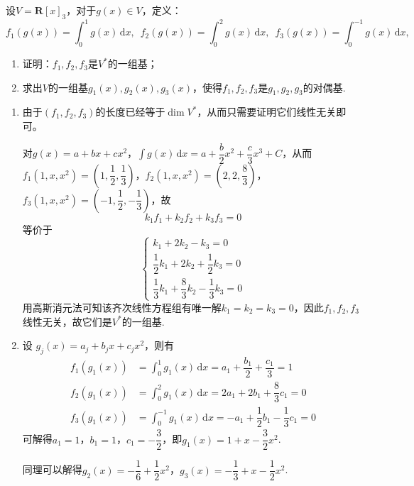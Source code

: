 \begin{example}{}{}
    设$V=\mathbf{R}[x]_3$，对于$g(x)\in V$，定义：
    \[f_1(g(x))=\displaystyle\int_0^1g(x)\,\mathrm{d}x,\enspace f_2(g(x))=\int_0^2g(x)\,\mathrm{d}x,\enspace f_3(g(x))=\int_0^{-1}g(x)\,\mathrm{d}x,\]
    \begin{enumerate}
        \item 证明：$f_1,f_2,f_3$是$V^*$的一组基；

        \item 求出$V$的一组基$g_1(x),g_2(x),g_3(x)$，使得$f_1,f_2,f_3$是$g_1,g_2,g_3$的对偶基.
    \end{enumerate}
\end{example}

\begin{solution}
    \begin{enumerate}
        \item 由于$(f_1, f_2, f_3)$的长度已经等于$\dim V^*$，从而只需要证明它们线性无关即可。

        对$g(x)=a+bx+cx^2$，$\displaystyle\int g(x)\,\mathrm{d}x=a+\dfrac{b}{2}x^2+\dfrac{c}{3}x^3+C$，从而$f_1(1, x, x^2)=\left(1, \dfrac{1}{2}, \dfrac{1}{3}\right)$，$f_2(1, x, x^2)=\left(2, 2, \dfrac{8}{3}\right)$，$f_3(1, x, x^2)=\left(-1, \dfrac{1}{2}, -\dfrac{1}{3}\right)$，故
        \[k_1f_1+k_2f_2+k_3f_3=0\]
        等价于
        \[
        \begin{cases}
            k_1 + 2k_2 - k_3 = 0 \\[0.5em]
            \dfrac{1}{2}k_1 + 2k_2 + \dfrac{1}{2}k_3 = 0 \\[0.5em]
            \dfrac{1}{3}k_1 + \dfrac{8}{3}k_2 - \dfrac{1}{3}k_3 = 0
        \end{cases}
        \]
        用高斯消元法可知该齐次线性方程组有唯一解$k_1=k_2=k_3=0$，因此$f_1,f_2,f_3$线性无关，故它们是$V^*$的一组基.
        \item 设 $g_j(x)=a_j+b_jx+c_jx^2$，则有
        \[
            \begin{aligned}
                f_1(g_1(x)) & = \int_0^1 g_1(x) \,\mathrm{d}x = a_1 + \dfrac{b_1}{2} + \dfrac{c_1}{3} = 1 \\
                f_2(g_1(x)) & = \int_0^2 g_1(x) \,\mathrm{d}x = 2a_1 + 2b_1 + \dfrac{8}{3}c_1 = 0 \\
                f_3(g_1(x)) & = \int_0^{-1} g_1(x) \,\mathrm{d}x = -a_1 + \dfrac{1}{2}b_1 - \dfrac{1}{3}c_1 = 0
            \end{aligned}
        \]
        可解得$a_1=1$，$b_1=1$，$c_1=-\dfrac{3}{2}$，即$g_1(x)=1+x-\dfrac{3}{2}x^2$.

        同理可以解得$g_2(x)=-\dfrac{1}{6}+\dfrac{1}{2}x^2$，$g_3(x)=-\dfrac{1}{3}+x-\dfrac{1}{2}x^2$.
    \end{enumerate}
\end{solution}

